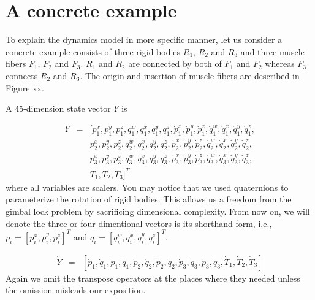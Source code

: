 \documentclass[a4paper,10pt]{article}
\begin{document}
\section{A concrete example}

To explain the dynamics model in more specific manner, let us consider
a concrete example consists of three rigid bodies $R_1$, $R_2$ and $R_3$
and three muscle fibers $F_1$, $F_2$ and $F_3$. $R_1$ and $R_2$ are connected
by both of $F_1$ and $F_2$ whereas $F_3$ connects $R_2$ and $R_3$. The
origin and insertion of muscle fibers are described in Figure xx.

A 45-dimension state vector $Y$ is

\begin{eqnarray*}
Y & = & [p_1^x, p_1^y, p_1^z, q_1^w, q_1^x, q_1^y, q_1^z, \dot{p}_1^x, \dot{p}_1^y, \dot{p}_1^z, \dot{q}_1^w, \dot{q}_1^x, \dot{q}_1^y, \dot{q}_1^z,\\
  &   &  p_2^x, p_2^y, p_2^z, q_2^w, q_2^x, q_2^y, q_2^z, \dot{p}_2^x, \dot{p}_2^y, \dot{p}_2^z, \dot{q}_2^w, \dot{q}_2^x, \dot{q}_2^y, \dot{q}_2^z,\\
  &   &  p_3^x, p_3^y, p_3^z, q_3^w, q_3^x, q_3^y, q_3^z, \dot{p}_3^x, \dot{p}_3^y, \dot{p}_3^z, \dot{q}_3^w, \dot{q}_3^x, \dot{q}_3^y, \dot{q}_3^z,\\
  &   & T_1, T_2, T_3]^T
\end{eqnarray*}
where all variables are scalers. You may notice that we used quaternions
to parameterize the rotation of rigid bodies. This allows us a freedom
from the gimbal lock problem by sacrificing dimensional complexity. From
now on, we will denote the three or four dimentional vectors is its shorthand
form, i.e., $p_i=[p_i^x, p_i^y, p_i^z]^T$ and $q_i=[q_i^w, q_i^x, q_i^y, q_i^z]^T$.

\begin{eqnarray*}
\dot{Y} & = & [\dot{p}_1, \dot{q}_1, \ddot{p}_1, \ddot{q}_1,
               \dot{p}_2, \dot{q}_2, \ddot{p}_2, \ddot{q}_2,
               \dot{p}_3, \dot{q}_3, \ddot{p}_3, \ddot{q}_3,
               \dot{T}_1, \dot{T}_2, \dot{T}_3]
\end{eqnarray*}
Again we omit the transpose operators at the places where they needed
unless the omission misleads our exposition.
\end{document}
